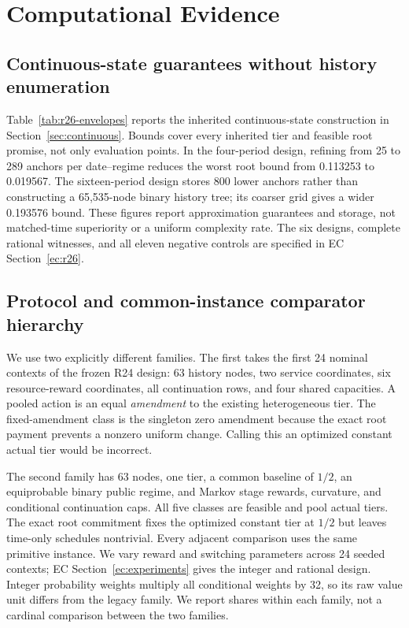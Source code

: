 \documentclass[11pt,letterpaper]{article}
\theoremstyle{definition}\newtheorem{assumption}[theorem]{Assumption}
\begin{document}



\section{Computational Evidence}\label{sec:evidence}

\subsection{Continuous-state guarantees without history enumeration}
Table~\ref{tab:r26-envelopes} reports the inherited continuous-state construction in Section~\ref{sec:continuous}. Bounds cover every inherited tier and feasible root promise, not only evaluation points. In the four-period design, refining from 25 to 289 anchors per date--regime reduces the worst root bound from 0.113253 to 0.019567. The sixteen-period design stores 800 lower anchors rather than constructing a 65,535-node binary history tree; its coarser grid gives a wider 0.193576 bound. These figures report approximation guarantees and storage, not matched-time superiority or a uniform complexity rate. The six designs, complete rational witnesses, and all eleven negative controls are specified in EC Section~\ref{ec:r26}.


\subsection{Protocol and common-instance comparator hierarchy}
We use two explicitly different families. The first takes the first 24 nominal contexts of the frozen R24 design: 63 history nodes, two service coordinates, six resource-reward coordinates, all continuation rows, and four shared capacities. A pooled action is an equal \emph{amendment} to the existing heterogeneous tier. The fixed-amendment class is the singleton zero amendment because the exact root payment prevents a nonzero uniform change. Calling this an optimized constant actual tier would be incorrect.

The second family has 63 nodes, one tier, a common baseline of $1/2$, an equiprobable binary public regime, and Markov stage rewards, curvature, and conditional continuation caps. All five classes are feasible and pool actual tiers. The exact root commitment fixes the optimized constant tier at $1/2$ but leaves time-only schedules nontrivial. Every adjacent comparison uses the same primitive instance. We vary reward and switching parameters across 24 seeded contexts; EC Section~\ref{ec:experiments} gives the integer and rational design. Integer probability weights multiply all conditional weights by 32, so its raw value unit differs from the legacy family. We report shares within each family, not a cardinal comparison between the two families.
\end{document}

